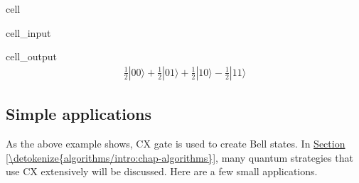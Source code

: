 \documentclass[letterpaper,10pt,english]{jupyterBook}
\begin{document}
\begin{sphinxuseclass}{cell}\begin{sphinxVerbatimInput}

\begin{sphinxuseclass}{cell_input}
\begin{sphinxVerbatim}[commandchars=\\\{\}]
   

\end{sphinxVerbatim}

\end{sphinxuseclass}\end{sphinxVerbatimInput}
\begin{sphinxVerbatimOutput}

\begin{sphinxuseclass}{cell_output}\begin{equation*}
\begin{split}\frac{1}{2} |00\rangle+\frac{1}{2} |01\rangle+\frac{1}{2} |10\rangle- \frac{1}{2} |11\rangle\end{split}
\end{equation*}
\end{sphinxuseclass}\end{sphinxVerbatimOutput}

\end{sphinxuseclass}

\subsection{Simple applications}
\label{\detokenize{q2gates/cx:simple-applications}}
\sphinxAtStartPar
As the above example shows, CX gate is used to create Bell states.  In \hyperref[\detokenize{algorithms/intro:chap-algorithms}]{Section \ref{\detokenize{algorithms/intro:chap-algorithms}}}, many quantum strategies that use CX extensively will be discussed.  Here are a few small applications.
\end{document}
